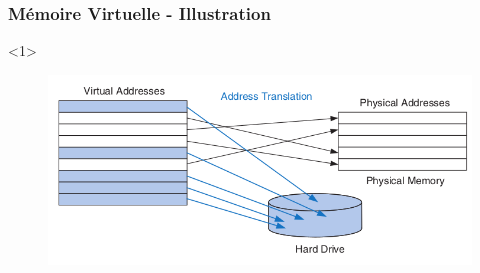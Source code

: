 \documentclass[8pt]{beamer}
\begin{document}
\begin{frame}[c]
    \frametitle{Mémoire Virtuelle - Illustration}
    \begin{onlyenv}<1>
        \vspace*{1.25cm}
        \begin{figure}
            \centering
            \includegraphics[width=.9\textwidth]{figures/vir.png}
        \end{figure}
    \end{onlyenv}
\end{frame}
\end{document}
